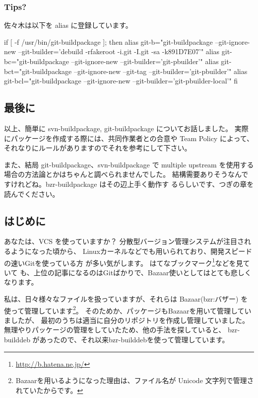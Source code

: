 \documentclass[mingoth,a4paper]{jsarticle}
\begin{document}
\subsubsection{Tips?}
佐々木は以下を alias に登録しています。
\begin{commandline}
if [ -f /usr/bin/git-buildpackage ]; then
  alias git-b="git-buildpackage --git-ignore-new --git-builder='debuild -rfakeroot -i.git -I.git -sa -k891D7E07'"
  alias git-bc="git-buildpackage --git-ignore-new --git-builder='git-pbuilder'"
  alias git-bct="git-buildpackage --git-ignore-new --git-tag --git-builder='git-pbuilder'"
  alias git-bcl="git-buildpackage --git-ignore-new --git-builder='git-pbuilder-local'"
fi
\end{commandline}


\subsection{最後に}

以上、簡単に svn-buildpackage, git-buildpackage についてお話しました。
実際にパッケージを作成する際には、共同作業者との合意や Team Policy によって、それなりにルールがありますのでそれを参考にして下さい。

また、結局 git-buildpackage、svn-buildpackage で multiple upstream を使用する場合の方法論とかはちゃんと調べられませんでした。
結構需要ありそうなんですけれどね。bzr-buildpackage はその辺上手く動作す
るらしいです、つぎの章を読んでください。

\subsection{はじめに}

あなたは、VCS を使っていますか？
分散型バージョン管理システムが注目されるようになった頃から、
Linuxカーネルなどでも用いられており、開発スピードの速いGitを使っている方
が多い気がします。
はてなブックマーク\footnote{\url{http://b.hatena.ne.jp/}}などを見ていて
も、上位の記事になるのはGitばかりで、Bazaar使いとしてはとても悲しくなります。

私は、日々様々なファイルを扱っていますが、それらは Bazaar(bzr:バザー) を
使って管理しています\footnote{Bazaarを用いるようになった理由は、ファイル名が
Unicode 文字列で管理されていたからです。}。
そのためか、パッケージもBazaarを用いて管理していましたが、
最初のうちは適当に自分のリポジトリを作成し管理していました。
無理やりパッケージの管理をしていたため、他の手法を探していると、
bzr-builddeb があったので、それ以来bzr-builddebを使って管理しています。
\end{document}

